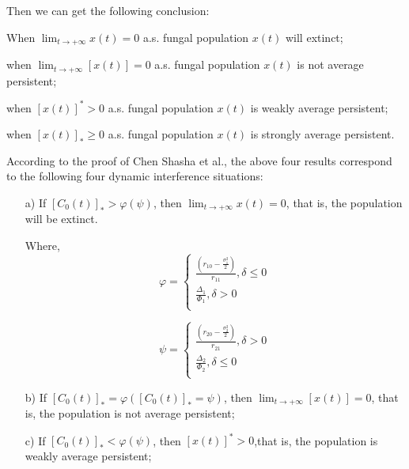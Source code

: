 Then we can get the following conclusion:

When $\lim_{t \to +\infty}x(t)=0$ a.s. fungal population $x (t)$ will extinct;

when $\lim_{t \to +\infty}[x(t)]=0$ a.s. fungal population $x(t)$ is not average persistent;

when $[x(t)]^*>0$ a.s. fungal population $x(t)$ is weakly average persistent;

when $[x(t)]_{*}\geqslant 0$ a.s. fungal population $x(t)$ is strongly average persistent.

According to the proof of Chen Shasha et al., the above four results correspond to the following four dynamic interference situations:

\begin{itemize}
    \item [a)] 
    If $[C_{0}(t)]_{*}>\varphi (\psi )$, then $\lim_{t \to +\infty}x(t)=0$, that is, the population will be extinct.

    Where,
    \begin{equation}\label{}
        \varphi =
        \left\{
        \begin{array}{l}
            \frac{(r_{10}-\frac{\sigma_{1}^2}{2})}{r_{11}},\delta \leqslant 0 \\
            \frac{\Delta_{1}}{\Phi_{1}},\delta>0 \\
        \end{array}
        \right.
        \end{equation}
    
    \begin{equation}\label{}
        \psi  =
        \left\{
        \begin{array}{l}
            \frac{(r_{20}-\frac{\sigma_{2}^2}{2})}{r_{21}},\delta>0 \\
            \frac{\Delta_{2}}{\Phi_{2}},\delta\leqslant 0 \\
        \end{array}
        \right.
        \end{equation}

    \item [b)] 
    If $[C_{0}(t)]_{*}=\varphi ([C_{0}(t)]_{*}=\psi )$, then $\lim_{t \to +\infty}[x(t)]=0$, that is, the population is not average persistent;

    \item [c)] 
    If $[C_{0}(t)]_{*}<\varphi (\psi )$, then $[x(t)]^*>0$,that is, the population is weakly average persistent;


\end{itemize}
